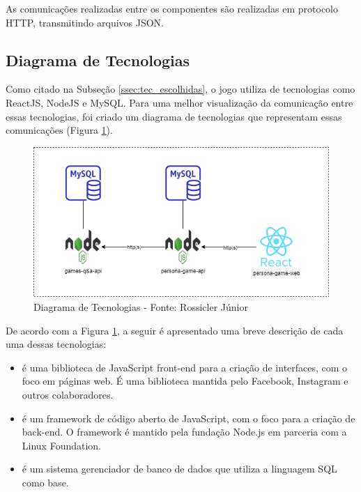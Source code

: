 {As comunicações realizadas entre os componentes são realizadas em protocolo HTTP, transmitindo arquivos JSON.

\subsection{Diagrama de Tecnologias}

Como citado na Subseção \ref{ssec:tec_escolhidas}, o jogo utiliza de tecnologias como ReactJS, NodeJS e MySQL. Para uma melhor visualização da comunicação entre essas tecnologias, foi criado um diagrama de tecnologias que representam essas comunicações (Figura \ref{Fig:diagrama_tecnologias.png}).

\begin{figure}[htbp]
	\centering
		\includegraphics[keepaspectratio=true,scale=0.67]{figuras/arquitetura/diagrama_tecnologias.png}
		\caption{Diagrama de Tecnologias - Fonte: Rossicler Júnior}
	\label{Fig:diagrama_tecnologias.png}
\end{figure}

De acordo com a Figura \ref{Fig:diagrama_tecnologias.png}, a seguir é apresentado uma breve descrição de cada uma dessas tecnologias:

\begin{itemize}
    \item \textbf{\citeauthor{reactjs}} é uma biblioteca de JavaScript front-end para a criação de interfaces, com o foco em páginas web. É uma biblioteca mantida pelo Facebook, Instagram e outros colaboradores.
    \item \textbf{\citeauthor{nodejs}} é um framework de código aberto de JavaScript, com o foco para a criação de back-end. O framework é mantido pela fundação Node.js em parceria com a Linux Foundation.
    \item \textbf{\citeauthor{mysql}} é um sistema gerenciador de banco de dados que utiliza a linguagem SQL como base.
\end{itemize}

}
